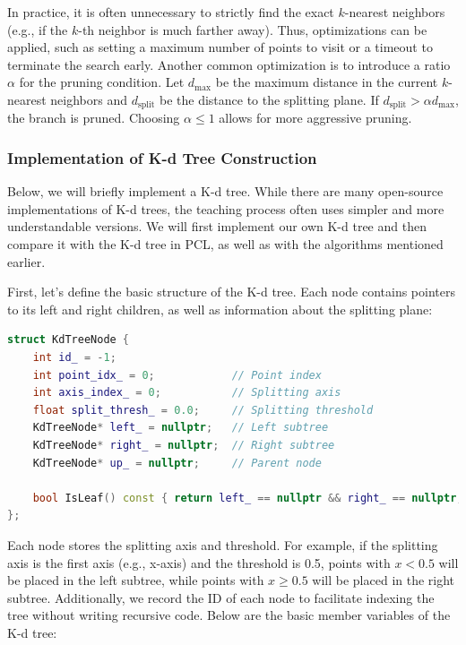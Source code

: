 In practice, it is often unnecessary to strictly find the exact \(k\)-nearest neighbors (e.g., if the \(k\)-th neighbor is much farther away). Thus, optimizations can be applied, such as setting a maximum number of points to visit or a timeout to terminate the search early. Another common optimization is to introduce a ratio \(\alpha\) for the pruning condition. Let \(d_{\text{max}}\) be the maximum distance in the current \(k\)-nearest neighbors and \(d_{\text{split}}\) be the distance to the splitting plane. If \(d_{\text{split}} > \alpha d_{\text{max}}\), the branch is pruned. Choosing \(\alpha \leq 1\) allows for more aggressive pruning.

\subsubsection{Implementation of K-d Tree Construction}
Below, we will briefly implement a K-d tree. While there are many open-source implementations of K-d trees, the teaching process often uses simpler and more understandable versions. We will first implement our own K-d tree and then compare it with the K-d tree in PCL, as well as with the algorithms mentioned earlier.

First, let's define the basic structure of the K-d tree. Each node contains pointers to its left and right children, as well as information about the splitting plane:

\begin{lstlisting}[language=c++, caption=src/ch5/kdtree.cc]
struct KdTreeNode {
	int id_ = -1;
	int point_idx_ = 0;            // Point index
	int axis_index_ = 0;           // Splitting axis
	float split_thresh_ = 0.0;     // Splitting threshold
	KdTreeNode* left_ = nullptr;   // Left subtree
	KdTreeNode* right_ = nullptr;  // Right subtree
	KdTreeNode* up_ = nullptr;     // Parent node
	
	bool IsLeaf() const { return left_ == nullptr && right_ == nullptr; }  // Whether it is a leaf
};
\end{lstlisting}

Each node stores the splitting axis and threshold. For example, if the splitting axis is the first axis (e.g., x-axis) and the threshold is 0.5, points with \(x < 0.5\) will be placed in the left subtree, while points with \(x \geq 0.5\) will be placed in the right subtree. Additionally, we record the ID of each node to facilitate indexing the tree without writing recursive code. Below are the basic member variables of the K-d tree:

